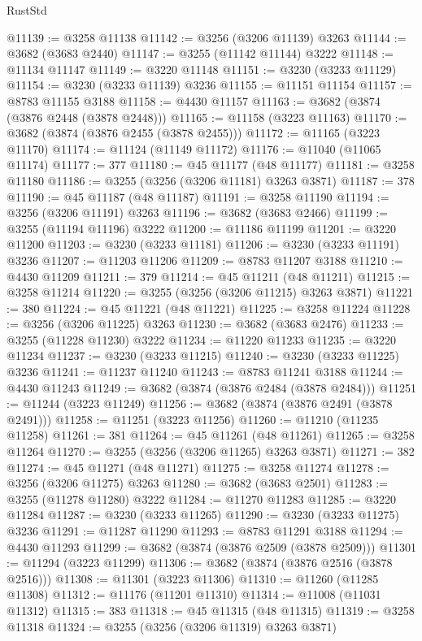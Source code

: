 \begin{lexlean}{RustStd}
\begin{coremodule}
{\begin{coremodule}
{{{{{{{{{{{{{{{{{{{{{{{{{{{{{{{{{{{{{@11139 := @3258 @11138
@11142 := @3256 (@3206 @11139) @3263
@11144 := @3682 (@3683 @2440)
@11147 := @3255 (@11142 @11144) @3222
@11148 := @11134 @11147
@11149 := @3220 @11148
@11151 := @3230 (@3233 @11129)
@11154 := @3230 (@3233 @11139) @3236
@11155 := @11151 @11154
@11157 := @8783 @11155 @3188
@11158 := @4430 @11157
@11163 := @3682 (@3874 (@3876 @2448 (@3878 @2448)))
@11165 := @11158 (@3223 @11163)
@11170 := @3682 (@3874 (@3876 @2455 (@3878 @2455)))
@11172 := @11165 (@3223 @11170)
@11174 := @11124 (@11149 @11172)
@11176 := @11040 (@11065 @11174)
@11177 := 377
@11180 := @45 @11177 (@48 @11177)
@11181 := @3258 @11180
@11186 := @3255 (@3256 (@3206 @11181) @3263 @3871)
@11187 := 378
@11190 := @45 @11187 (@48 @11187)
@11191 := @3258 @11190
@11194 := @3256 (@3206 @11191) @3263
@11196 := @3682 (@3683 @2466)
@11199 := @3255 (@11194 @11196) @3222
@11200 := @11186 @11199
@11201 := @3220 @11200
@11203 := @3230 (@3233 @11181)
@11206 := @3230 (@3233 @11191) @3236
@11207 := @11203 @11206
@11209 := @8783 @11207 @3188
@11210 := @4430 @11209
@11211 := 379
@11214 := @45 @11211 (@48 @11211)
@11215 := @3258 @11214
@11220 := @3255 (@3256 (@3206 @11215) @3263 @3871)
@11221 := 380
@11224 := @45 @11221 (@48 @11221)
@11225 := @3258 @11224
@11228 := @3256 (@3206 @11225) @3263
@11230 := @3682 (@3683 @2476)
@11233 := @3255 (@11228 @11230) @3222
@11234 := @11220 @11233
@11235 := @3220 @11234
@11237 := @3230 (@3233 @11215)
@11240 := @3230 (@3233 @11225) @3236
@11241 := @11237 @11240
@11243 := @8783 @11241 @3188
@11244 := @4430 @11243
@11249 := @3682 (@3874 (@3876 @2484 (@3878 @2484)))
@11251 := @11244 (@3223 @11249)
@11256 := @3682 (@3874 (@3876 @2491 (@3878 @2491)))
@11258 := @11251 (@3223 @11256)
@11260 := @11210 (@11235 @11258)
@11261 := 381
@11264 := @45 @11261 (@48 @11261)
@11265 := @3258 @11264
@11270 := @3255 (@3256 (@3206 @11265) @3263 @3871)
@11271 := 382
@11274 := @45 @11271 (@48 @11271)
@11275 := @3258 @11274
@11278 := @3256 (@3206 @11275) @3263
@11280 := @3682 (@3683 @2501)
@11283 := @3255 (@11278 @11280) @3222
@11284 := @11270 @11283
@11285 := @3220 @11284
@11287 := @3230 (@3233 @11265)
@11290 := @3230 (@3233 @11275) @3236
@11291 := @11287 @11290
@11293 := @8783 @11291 @3188
@11294 := @4430 @11293
@11299 := @3682 (@3874 (@3876 @2509 (@3878 @2509)))
@11301 := @11294 (@3223 @11299)
@11306 := @3682 (@3874 (@3876 @2516 (@3878 @2516)))
@11308 := @11301 (@3223 @11306)
@11310 := @11260 (@11285 @11308)
@11312 := @11176 (@11201 @11310)
@11314 := @11008 (@11031 @11312)
@11315 := 383
@11318 := @45 @11315 (@48 @11315)
@11319 := @3258 @11318
@11324 := @3255 (@3256 (@3206 @11319) @3263 @3871)
}}}}}}}}}}}}}}}}}}}}}}}}}}}}}}}}}}}}}
\end{coremodule}}
\end{coremodule}
\end{lexlean}
